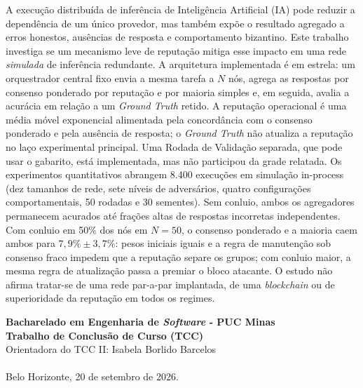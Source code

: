 \documentclass[12pt]{article}
\begin{document}
\begin{resumo}
  A execução distribuída de inferência de Inteligência Artificial (IA) pode reduzir a dependência de um único provedor, mas também expõe o resultado agregado a erros honestos, ausências de resposta e comportamento bizantino. Este trabalho investiga se um mecanismo leve de reputação mitiga esse impacto em uma rede \emph{simulada} de inferência redundante. A arquitetura implementada é em estrela: um orquestrador central fixo envia a mesma tarefa a $N$ nós, agrega as respostas por consenso ponderado por reputação e por maioria simples e, em seguida, avalia a acurácia em relação a um \textit{Ground Truth} retido. A reputação operacional é uma média móvel exponencial alimentada pela concordância com o consenso ponderado e pela ausência de resposta; o \textit{Ground Truth} não atualiza a reputação no laço experimental principal. Uma Rodada de Validação separada, que pode usar o gabarito, está implementada, mas não participou da grade relatada. Os experimentos quantitativos abrangem 8.400 execuções em simulação in-process (dez tamanhos de rede, sete níveis de adversários, quatro configurações comportamentais, 50 rodadas e 30 sementes). Sem conluio, ambos os agregadores permanecem acurados até frações altas de respostas incorretas independentes. Com conluio em 50\% dos nós em $N=50$, o consenso ponderado e a maioria caem ambos para $7{,}9\%\pm 3{,}7\%$: pesos iniciais iguais e a regra de manutenção sob consenso fraco impedem que a reputação separe os grupos; com conluio maior, a mesma regra de atualização passa a premiar o bloco atacante. O estudo não afirma tratar-se de uma rede par-a-par implantada, de uma \textit{blockchain} ou de superioridade da reputação em todos os regimes.
\end{resumo}

\begin{tcolorbox}
\footnotesize
\textbf{Bacharelado em Engenharia de \emph{Software} - PUC Minas\\
Trabalho de Conclusão de Curso (TCC)} \\

\indent Orientadora do TCC II: Isabela Borlido Barcelos \\ \\
Belo Horizonte, 20 de setembro de 2026.
\end{tcolorbox}

\end{document}
